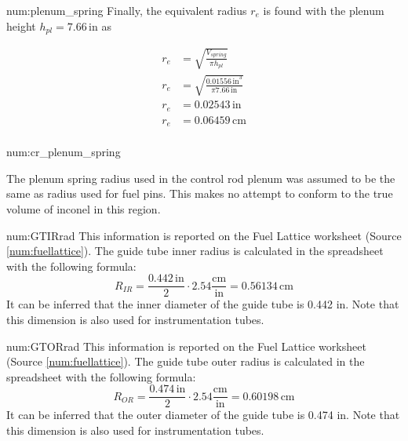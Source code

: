 \begin{numitem}{num:plenum_spring}
  Finally, the equivalent radius $r_e$ is found with the plenum height $h_{pl} =
  7.66\,\mathrm{in}$ as
  
\[
  \begin{aligned}
    r_e &= \sqrt{\frac{V_{spring}}{\pi h_{pl}}} \\
    r_e &= \sqrt{\frac{0.01556\,\mathrm{in}^3}{\pi 7.66\,\mathrm{in}}} \\
    r_e &= 0.02543\,\mathrm{in} \\
    r_e &= 0.06459\,\mathrm{cm} \\
  \end{aligned}
\]

\end{numitem}

\begin{numitem}{num:cr_plenum_spring}

  The plenum spring radius used in the control rod plenum was assumed to be the
  same as radius used for fuel pins.  This makes no attempt to conform to the
  true volume of inconel in this region.

\end{numitem}

\begin{numitem}{num:GTIRrad}
  This information is reported on the Fuel Lattice worksheet (Source \ref{num:fuellattice}). The guide tube inner radius is calculated in the spreadsheet with the following formula:
\[
    R_{IR} = \frac{0.442\,\mathrm{in}}{2}\cdot 2.54 \mathrm{\frac{cm}{in}} = 0.56134\,\mathrm{cm}
\]
  It can be inferred that the inner diameter of the guide tube is 0.442 in. Note that this dimension is also used for instrumentation tubes.
  
\end{numitem}

\begin{numitem}{num:GTORrad}
  This information is reported on the Fuel Lattice worksheet (Source \ref{num:fuellattice}). The guide tube outer radius is calculated in the spreadsheet with the following formula:
\[
    R_{OR} = \frac{0.474\,\mathrm{in}}{2}\cdot 2.54 \mathrm{\frac{cm}{in}} = 0.60198\,\mathrm{cm}
\]
  It can be inferred that the outer diameter of the guide tube is 0.474 in. Note that this dimension is also used for instrumentation tubes.
\end{numitem}

